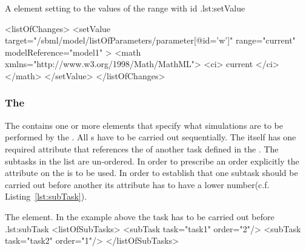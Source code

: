 \begin{myXmlLst}{A  element setting  to the values of the range with id .}{lst:setValue}

  <listOfChanges>
    <setValue target="/sbml/model/listOfParameters/parameter[@id='w']" range="current" modelReference="model1" > 
      <math xmlns="http://www.w3.org/1998/Math/MathML"> 
         <ci> current </ci> 
      </math> 
    </setValue> 
  </listOfChanges>
\end{myXmlLst}

\subsubsection{The }
\label{class:subTasks}
The  contains one or more  elements that specify what simulations are to be performed by the . All s have to be carried out sequentially. The  itself has one required attribute  that references the  of another task defined in the . The subtasks in the list are un-ordered.  In order to prescribe an order explicitly the  attribute on the  is to be used. In order to establish that one subtask should be carried out before another its  attribute has to have a lower number(c.f. Listing~\ref{lst:subTask}).

\begin{myXmlLst}{The  element. In the example above the task  has to be carried out before .}{lst:subTask}
  <listOfSubTasks>
    <subTask task="task1" order="2"/> 
    <subTask task="task2" order="1"/> 
  </listOfSubTasks>
\end{myXmlLst}

 


